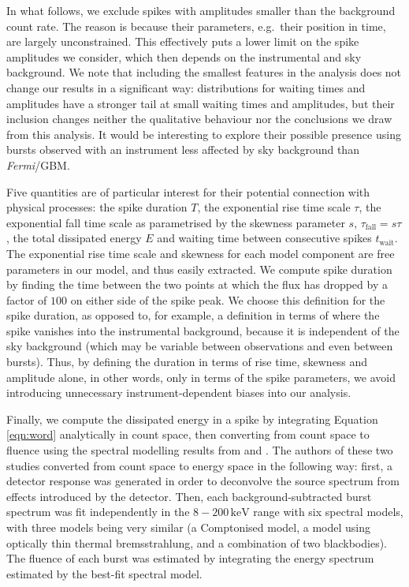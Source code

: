 \documentclass[12pt]{emulateapj}
\newcommand{\project}[1]{\textsl{#1}}
\newcommand{\fermi}{\project{Fermi}}
\begin{document}
In what follows, we exclude spikes with amplitudes smaller than the background count rate. The reason is because
 their parameters, e.g.\ their position in time, are largely unconstrained.
This effectively puts a lower limit on the spike amplitudes we consider, which then depends on the instrumental and sky background. We note
that including the smallest features in the analysis does not change our results in a significant way: distributions for 
waiting times and amplitudes have a stronger tail at small waiting times and amplitudes, but their inclusion changes neither
the qualitative behaviour nor the conclusions we draw from this analysis. It would be interesting to explore their possible presence
using bursts observed with an instrument less affected by sky background than \fermi/GBM\@.

Five quantities are of particular interest for their potential connection with physical processes: the spike duration $T$, the exponential rise time scale $\tau$, the exponential fall
time scale as parametrised by the skewness parameter $s$, $\tau_{\mathrm{fall}} = s\tau$, the total dissipated energy $E$ and waiting 
time between consecutive spikes $t_\mathrm{wait}$. The exponential rise time scale and skewness for each model component are free parameters
in our model, and thus easily extracted. We compute spike duration by finding the time between the two points at which the flux has dropped by a
 factor of $100$ on either side of the spike peak. We choose this definition for the spike duration, as opposed to, for example, a definition in terms of where the spike vanishes
 into the instrumental background, because it is independent of the sky background (which may be variable between observations and even between bursts). Thus, by defining the 
 duration in terms of rise time, skewness and amplitude alone, in other words, only in terms of the spike parameters, we avoid introducing unnecessary instrument-dependent
 biases into our analysis.


 Finally, we compute the dissipated energy in a spike by integrating Equation \ref{eqn:word} analytically in count space,
 then converting from count space to fluence using the spectral modelling results from \citet{vanderhorst2012} and \citet{vonkienlin2012}. The authors of these two studies converted from 
 count space to energy space in the following way: first, a detector response was generated in order to deconvolve the source spectrum from effects introduced by the detector. 
 Then, each background-subtracted burst spectrum was fit independently in the $8-200\,\mathrm{keV}$ range with six spectral models, with three models being very similar
  (a Comptonised model, a model using optically thin thermal bremsstrahlung, and a combination of two blackbodies). The fluence of each burst was estimated by integrating the 
  energy spectrum estimated by the best-fit spectral model.
 
\end{document}
